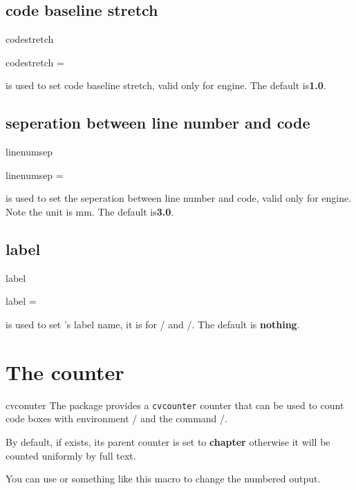 \documentclass{ctxdoc-en}
\begin{document}
\subsection{code baseline stretch}

\begin{function}[added=2021-12-26,updated=2021-12-26]{codestretch}
  \begin{syntax}
    codestretch =  
  \end{syntax}
   is used to set code baseline stretch, valid only for  engine.
  The default is\textbf{1.0}.
\end{function}

\subsection{seperation between line number and code}

\begin{function}[added=2021-12-26,updated=2022-1-28]{linenumsep}
  \begin{syntax}
    linenumsep =  
  \end{syntax}
   is used to set the seperation between line number and code,
  valid only for  engine.
  Note the unit is mm.
  The default is\textbf{3.0}.
\end{function}

\subsection{label}

\begin{function}[added=2022-1-4,updated=2022-1-4]{label}
  \begin{syntax}
    label =  
  \end{syntax}
   is used to set  's label name,
  it is for / and /.
  The default is \textbf{nothing}.
\end{function}

\section{The counter}

\begin{function}[added=2021-12-28,updated=2021-12-28]{cvconuter}
  The  package provides a \texttt{cvcounter} counter 
  that can be used to count code boxes with environment /
  and the command /. 

  By default, if  exists, its parent counter is set to \textbf{chapter}
  otherwise it will be counted uniformly by full text. 

  You can use
  or something like this macro to change the numbered output.
\end{function}
\end{document}
